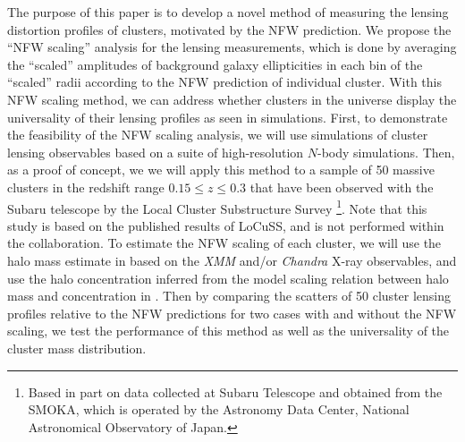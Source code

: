 \documentclass[iop, apj]{emulateapj}
\newcommand{\?}{\stackrel{?}{=}}
\begin{document}
The purpose of this paper is to develop a novel method of measuring the
lensing distortion profiles of clusters, motivated by the NFW
prediction. We propose the ``NFW scaling'' analysis for the lensing
measurements, which is done by averaging the ``scaled'' amplitudes of
background galaxy ellipticities in each bin of the ``scaled'' radii
according to the NFW prediction of individual cluster.  With this NFW
scaling method, we can address whether clusters in the universe display
the universality of their lensing profiles as seen in simulations.
First, to demonstrate the feasibility of the NFW scaling analysis, we
will use simulations of cluster lensing observables based on a suite of
high-resolution $N$-body simulations. Then, as a proof of concept, we we
will apply this method to a sample of 50 massive clusters in the
redshift range $0.15\le z\le 0.3$ that have been observed with the
Subaru telescope by the Local Cluster Substructure Survey \citep[LoCuSS,
and also see][for
details]{Okabeetal:10,Okabeetal:13,Martinoetal:14}\footnote{Based in
part on data collected at Subaru Telescope and obtained from the SMOKA,
which is operated by the Astronomy Data Center, National Astronomical
Observatory of Japan.}. Note that this study is based on the published
results of LoCuSS, and is not performed within the collaboration.
To estimate the NFW scaling of each cluster, we will use the halo mass
estimate in \citet{Martinoetal:14} based on the {\it XMM} and/or {\it
Chandra} X-ray observables, and use the halo concentration inferred from
the model scaling relation between halo mass and concentration in
\citet{DiemerKravtsov:14}.  Then by comparing the scatters of 50 cluster
lensing profiles relative to the NFW predictions for two cases with and
without the NFW scaling, we test the performance of this method as well
as the universality of the cluster mass distribution.
\end{document}
